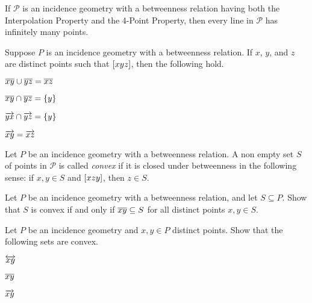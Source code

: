 \begin{prop}
If $\mathcal{P}$ is an incidence geometry with a betweenness relation having both the Interpolation Property and the 4-Point Property, then every line in $\mathcal{P}$ has infinitely many points.
\end{prop}



\Exercises%

\begin{exercise}
Suppose $P$ is an incidence geometry with a betweenness relation. If $x$, $y$, and $z$ are distinct points such that $[ x y z ]$, then the following hold.
\begin{proplist}
\item $\overline{xy} \cup \overline{yz} = \overline{xz}$
\item $\overline{xy} \cap \overline{yz} = \{y\}$
\item $\overrightarrow{yx} \cap \overrightarrow{yz} = \{y\}$
\item $\overrightarrow{xy} = \overrightarrow{xz}$
\end{proplist}
\end{exercise}

\begin{dfn}[Convexity]
Let $P$ be an incidence geometry with a betweenness relation. A non empty set $S$ of points in $\mathcal{P}$ is called \emph{convex} if it is closed under betweenness in the following sense: if $x,y \in S$ and $[ x z y ]$, then $z \in S$.
\end{dfn}

\begin{exercise}
Let $P$ be an incidence geometry with a betweenness relation, and let $S \subseteq P$. Show that $S$ is convex if and only if $\overline{xy} \subseteq S$ for all distinct points $x,y \in S$.
\end{exercise}

\begin{exercise}
Let $P$ be an incidence geometry and $x,y \in P$ distinct points. Show that the following sets are convex.
\begin{proplist}
\item $\overleftrightarrow{xy}$
\item $\overline{xy}$
\item $\overrightarrow{xy}$
\end{proplist}
\end{exercise}
